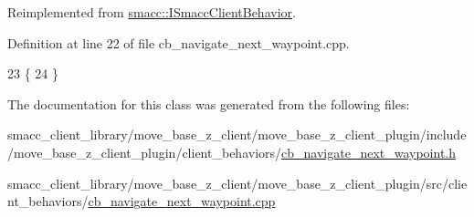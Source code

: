 Reimplemented from \hyperlink{classsmacc_1_1ISmaccClientBehavior_ad1198fdb2cbdf11f3276d3e23d4c0a50}{smacc\+::\+I\+Smacc\+Client\+Behavior}.



Definition at line 22 of file cb\+\_\+navigate\+\_\+next\+\_\+waypoint.\+cpp.


\begin{DoxyCode}
23 \{
24 \}
\end{DoxyCode}


The documentation for this class was generated from the following files\+:\begin{DoxyCompactItemize}
\item 
smacc\+\_\+client\+\_\+library/move\+\_\+base\+\_\+z\+\_\+client/move\+\_\+base\+\_\+z\+\_\+client\+\_\+plugin/include/move\+\_\+base\+\_\+z\+\_\+client\+\_\+plugin/client\+\_\+behaviors/\hyperlink{cb__navigate__next__waypoint_8h}{cb\+\_\+navigate\+\_\+next\+\_\+waypoint.\+h}\item 
smacc\+\_\+client\+\_\+library/move\+\_\+base\+\_\+z\+\_\+client/move\+\_\+base\+\_\+z\+\_\+client\+\_\+plugin/src/client\+\_\+behaviors/\hyperlink{cb__navigate__next__waypoint_8cpp}{cb\+\_\+navigate\+\_\+next\+\_\+waypoint.\+cpp}\end{DoxyCompactItemize}
